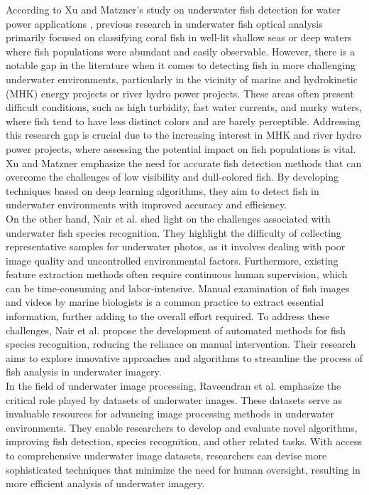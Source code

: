 According to Xu and Matzner's study on underwater fish detection for water power applications \cite{xu2018underwater}, previous research in underwater fish optical analysis primarily focused on classifying coral fish in well-lit shallow seas or deep waters where fish populations were abundant and easily observable. However, there is a notable gap in the literature when it comes to detecting fish in more challenging underwater environments, particularly in the vicinity of marine and hydrokinetic (MHK) energy projects or river hydro power projects. These areas often present difficult conditions, such as high turbidity, fast water currents, and murky waters, where fish tend to have less distinct colors and are barely perceptible. Addressing this research gap is crucial due to the increasing interest in MHK and river hydro power projects, where assessing the potential impact on fish populations is vital. Xu and Matzner emphasize the need for accurate fish detection methods that can overcome the challenges of low visibility and dull-colored fish. By developing techniques based on deep learning algorithms, they aim to detect fish in underwater environments with improved accuracy and efficiency. \\
On the other hand, Nair et al. \cite{nair2018under} shed light on the challenges associated with underwater fish species recognition. They highlight the difficulty of collecting representative samples for underwater photos, as it involves dealing with poor image quality and uncontrolled environmental factors. Furthermore, existing feature extraction methods often require continuous human supervision, which can be time-consuming and labor-intensive. Manual examination of fish images and videos by marine biologists is a common practice to extract essential information, further adding to the overall effort required. To address these challenges, Nair et al. propose the development of automated methods for fish species recognition, reducing the reliance on manual intervention. Their research aims to explore innovative approaches and algorithms to streamline the process of fish analysis in underwater imagery. \\
In the field of underwater image processing, Raveendran et al. \cite{raveendran2021underwater} emphasize the critical role played by datasets of underwater images. These datasets serve as invaluable resources for advancing image processing methods in underwater environments. They enable researchers to develop and evaluate novel algorithms, improving fish detection, species recognition, and other related tasks. With access to comprehensive underwater image datasets, researchers can devise more sophisticated techniques that minimize the need for human oversight, resulting in more efficient analysis of underwater imagery.\\

